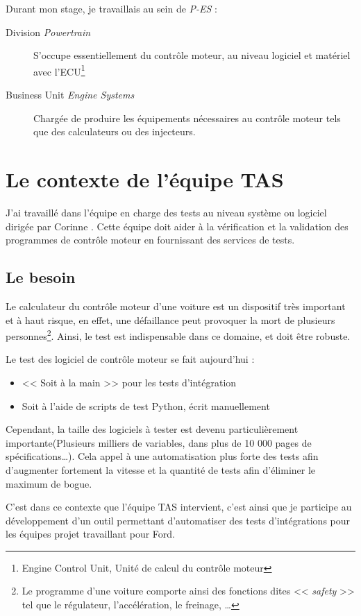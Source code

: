 Durant mon stage, je travaillais au sein de \textit{P-ES} : 
\begin{description}
	\item[Division \textit{Powertrain}] S'occupe essentiellement du contrôle moteur, au niveau logiciel et matériel avec l'ECU\footnote{Engine Control Unit, Unité de calcul du contrôle moteur}
	\item[Business Unit \textit{Engine Systems}] Chargée de produire les équipements nécessaires au contrôle moteur tels que des calculateurs ou des injecteurs.
\end{description}

	\section{Le contexte de l'équipe TAS}
		J'ai travaillé dans l'équipe en charge des tests au niveau système ou logiciel dirigée par Corinne . Cette équipe doit aider à la vérification et la validation des programmes de contrôle moteur en fournissant des services de tests. 
		
 		\subsection{Le besoin} \label{besoinTests}
 		Le calculateur du contrôle moteur d'une voiture est un dispositif très important et à haut risque, en effet, une défaillance peut provoquer la mort de plusieurs personnes\footnote{Le programme d'une voiture comporte ainsi des fonctions dites << \textit{safety} >> tel que le régulateur, l'accélération, le freinage, \ldots}. Ainsi, le test est indispensable dans ce domaine, et doit être robuste. 

Le test des logiciel de contrôle moteur se fait aujourd'hui : 
\begin{itemize}
	\item << Soit à la main >> pour les tests d'intégration
	\item Soit à l'aide de scripts de test Python, écrit manuellement
\end{itemize}
Cependant, la taille des logiciels à tester est devenu particulièrement importante(Plusieurs milliers de variables, dans plus de 10 000 pages de spécifications\ldots). Cela appel à une automatisation plus forte des tests afin d'augmenter fortement la vitesse et la quantité de tests afin d'éliminer le maximum de bogue.

C'est dans ce contexte que l'équipe TAS intervient, c'est ainsi que je participe au développement d'un outil permettant d'automatiser des tests d'intégrations pour les équipes projet travaillant pour Ford.
